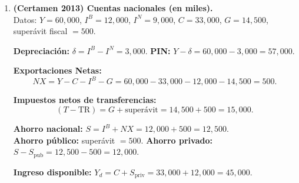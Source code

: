 \documentclass[11pt,addpoints]{article}
\begin{document}
\begin{enumerate}
\item \textbf{(Certamen 2013) Cuentas nacionales (en miles).}\\
Datos: \(Y=60{,}000\), \(I^B=12{,}000\), \(I^N=9{,}000\), \(C=33{,}000\), \(G=14{,}500\), superávit fiscal \(=500\).

\textbf{Depreciación: } \(\delta=I^B-I^N=\boxed{3{,}000}\).\quad
\textbf{PIN: } \(Y-\delta=60{,}000-3{,}000=\boxed{57{,}000}\).

\textbf{Exportaciones Netas: }
\[
NX=Y-C-I^B-G=60{,}000-33{,}000-12{,}000-14{,}500=\boxed{500}.
\]

\textbf{Impuestos netos de transferencias: } 
\[
(T-\text{TR})=G+\text{superávit}=14{,}500+500=\boxed{15{,}000}.
\]

\textbf{Ahorro nacional: } \(S=I^B+NX=12{,}000+500=\boxed{12{,}500}\).\\
\textbf{Ahorro público: } superávit \(=\boxed{500}\). \quad
\textbf{Ahorro privado: } \(S-S_{\text{pub}}=12{,}500-500=\boxed{12{,}000}\).

\textbf{Ingreso disponible: } \(Y_d=C+S_{\text{priv}}=33{,}000+12{,}000=\boxed{45{,}000}\).
\end{enumerate}
\end{document}
